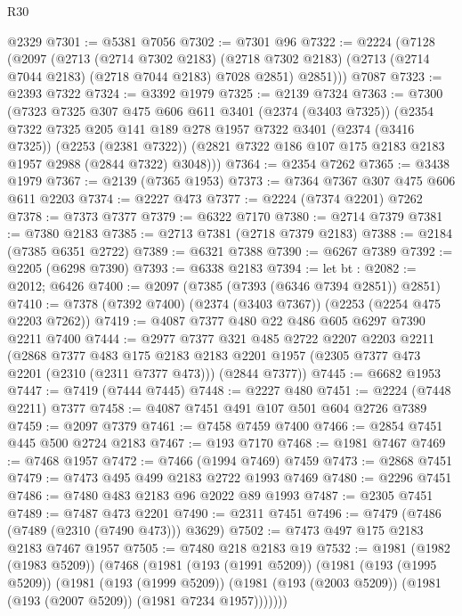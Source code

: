 \begin{lexlean}{R30}
\begin{coremodule}
    @2329
@7301 := @5381 @7056
@7302 := @7301 @96
@7322 := @2224
    (@7128
      (@2097
        (@2713
          (@2714 @7302 @2183)
          (@2718 @7302 @2183)
          (@2713 (@2714 @7044 @2183) (@2718 @7044 @2183) @7028 @2851)
          @2851)))
    @7087
@7323 := @2393 @7322
@7324 := @3392 @1979
@7325 := @2139 @7324
@7363 := @7300
    (@7323
      @7325
      @307
      @475
      @606
      @611
      @3401
      (@2374 (@3403 @7325))
      (@2354
        @7322
        @7325
        @205
        @141
        @189
        @278
        @1957
        @7322
        @3401
        (@2374 (@3416 @7325))
        (@2253 (@2381 @7322))
        (@2821 @7322 @186 @107 @175 @2183 @2183 @1957 @2988 (@2844 @7322) @3048)))
@7364 := @2354 @7262
@7365 := @3438 @1979
@7367 := @2139 (@7365 @1953)
@7373 := @7364 @7367 @307 @475 @606 @611 @2203
@7374 := @2227 @473
@7377 := @2224 (@7374 @2201) @7262
@7378 := @7373 @7377
@7379 := @6322 @7170
@7380 := @2714 @7379
@7381 := @7380 @2183
@7385 := @2713 @7381 (@2718 @7379 @2183)
@7388 := @2184 (@7385 @6351 @2722)
@7389 := @6321 @7388
@7390 := @6267 @7389
@7392 := @2205 (@6298 @7390)
@7393 := @6338 @2183
@7394 := let bt : @2082 := @2012; @6426
@7400 := @2097 (@7385 (@7393 (@6346 @7394 @2851)) @2851)
@7410 := @7378 (@7392 @7400) (@2374 (@3403 @7367)) (@2253 (@2254 @475 @2203 @7262))
@7419 := @4087 @7377 @480 @22 @486 @605 @6297 @7390 @2211 @7400
@7444 := @2977
    @7377
    @321
    @485
    @2722
    @2207
    @2203
    @2211
    (@2868
      @7377
      @483
      @175
      @2183
      @2183
      @2201
      @1957
      (@2305 @7377 @473 @2201 (@2310 (@2311 @7377 @473)))
      (@2844 @7377))
@7445 := @6682 @1953
@7447 := @7419 (@7444 @7445)
@7448 := @2227 @480
@7451 := @2224 (@7448 @2211) @7377
@7458 := @4087 @7451 @491 @107 @501 @604 @2726 @7389
@7459 := @2097 @7379
@7461 := @7458 @7459 @7400
@7466 := @2854 @7451 @445 @500 @2724 @2183
@7467 := @193 @7170
@7468 := @1981 @7467
@7469 := @7468 @1957
@7472 := @7466 (@1994 @7469) @7459
@7473 := @2868 @7451
@7479 := @7473 @495 @499 @2183 @2722 @1993 @7469
@7480 := @2296 @7451
@7486 := @7480 @483 @2183 @96 @2022 @89 @1993
@7487 := @2305 @7451
@7489 := @7487 @473 @2201
@7490 := @2311 @7451
@7496 := @7479 (@7486 (@7489 (@2310 (@7490 @473))) @3629)
@7502 := @7473 @497 @175 @2183 @2183 @7467 @1957
@7505 := @7480 @218 @2183 @19
@7532 := @1981
    (@1982 (@1983 @5209))
    (@7468
      (@1981
        (@193 (@1991 @5209))
        (@1981
          (@193 (@1995 @5209))
          (@1981
            (@193 (@1999 @5209))
            (@1981 (@193 (@2003 @5209)) (@1981 (@193 (@2007 @5209)) (@1981 @7234 @1957)))))))

\end{coremodule}
\end{lexlean}
